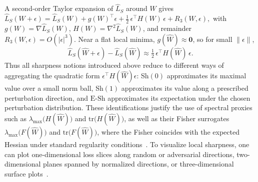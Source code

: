 \documentclass[10pt]{article} %
\begin{document}
A second-order Taylor expansion of $ \hat{L}_S$ around $W$ gives
$\hat{L}_S(W+\epsilon) =  \hat{L}_S(W) + g(W)^{\top}{\epsilon} + \tfrac12\,{\epsilon}^{\top}H(W)\,{\epsilon} + R_3(W,{\epsilon}),$
with $g(W)=\nabla \hat L_S(W)$, $H(W)=\nabla^2 \hat L_S(W)$, and remainder $R_3(W,{\epsilon})=O(|{\epsilon}|^3)$.
Near a flat local minima, $g(\hat{W})\approx \mathbf 0$, so for small $\|{\epsilon}\|$,
\begin{equation}
\label{eq: approx}
    \hat{L}_S(\hat{W}+{\epsilon})-\hat{L}_S(\hat{W})
\approx \tfrac12\,{\epsilon}^{\top}H(\hat{W})\,{\epsilon}.
\end{equation}
Thus all sharpness notions introduced above reduce to different ways of aggregating the quadratic form $\epsilon^{\top}H(\hat W)\epsilon$: Sh$(0)$ approximates its maximal value over a small norm ball, Sh$(1)$ approximates its value along a prescribed perturbation direction, and $\mathrm{E\text{-}Sh}$ approximates its expectation under the chosen perturbation distribution. These identifications justify the use of spectral proxies such as $\lambda_{\max}\big(H(\hat{W})\big)$ and $\mathrm{tr}\big(H(\hat{W})\big)$, as well as their Fisher surrogates $\lambda_{\max}\big(F(\hat{W})\big)$ and $\mathrm{tr}\big(F(\hat{W})\big)$, where the Fisher coincides with the expected Hessian under standard regularity conditions~\citep{dinhSharpMinimaCan2017,caoTradeoffFlatnessOptimization2024,tsuzukuNormalizedFlatMinima2020,miMakeSharpnessAwareMinimization2022}. 
To visualize local sharpness, one can plot one-dimensional loss slices along random or adversarial directions, two-dimensional planes spanned by normalized directions, or three-dimensional surface plots~\citep{goodfellowQualitativelyCharacterizingNeural2015,izmailovAveragingWeightsLeads2019,chaSWADDomainGeneralization2021,liVisualizingLossLandscape2018}.
\end{document}
